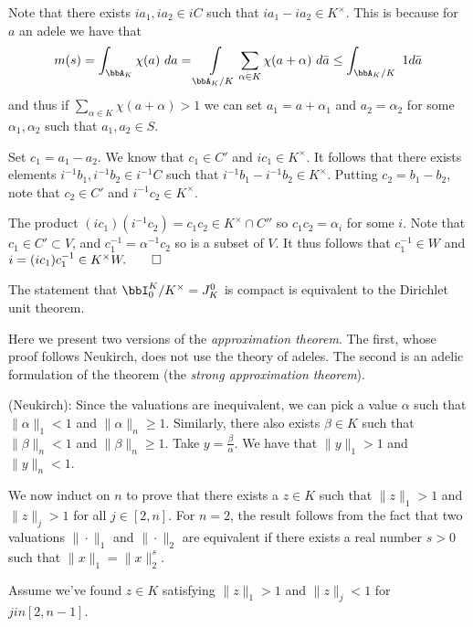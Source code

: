 \documentclass[a4paper, 12pt,oneside,openany]{book}
\begin{document}
Note that there exists $ia_1, ia_2 \in iC$ such that $ia_1-ia_2 \in K^\times$. This is because for $a$ an adele we have that $$m(s) = \int_{\bbA_K} \chi(a)\ da = \int\limits_{\bbA_K/K} \sum\limits_{\alpha \in K} \chi(a+\alpha)\ d \bar{a} \leq \int_{\bbA_K/K}\ 1 d\bar{a}$$ and thus if $\sum\limits_{\alpha \in K} \chi(a+\alpha)>1$ we can set $a_1=a+\alpha_1$ and $a_2=\alpha_2$ for some $\alpha_1, \alpha_2$ such that $a_1, a_2 \in S$. 

Set $c_1 = a_1-a_2$. We know that $c_1 \in C'$ and $ic_1 \in K^\times$. It follows that there exists elements $i^{-1}b_1, i^{-1}b_2 \in i^{-1}C$ such that $i^{-1}b_1- i^{-1}b_2 \in K^\times$. Putting $c_2=b_1-b_2$, note that $c_2 \in C'$ and $i^{-1}c_2 \in K^\times$. 

The product $(ic_1)(i^{-1}c_2)=c_1c_2 \in K^\times \cap C''$ so $c_1c_2=\alpha_i$ for some $i$. Note that $c_1 \in C' \subset V$, and $c_1^{-1}=\alpha^{-1}c_2$ so is a subset of $V$. It thus follows that $c_1^{-1} \in W$ and $i = (ic_1)c_1^{-1} \in K^\times W. \qed$

The statement that $\bbI_0^K/K^\times = J_K^0$ is compact is equivalent to the Dirichlet unit theorem.

Here we present two versions of the \emph{approximation theorem}. The first, whose proof follows Neukirch, does not use the theory of adeles. The second is an adelic formulation of the theorem (the \emph{strong approximation theorem}).


 (Neukirch): Since the valuations are inequivalent, we can pick a value $\alpha$ such that $\|\alpha \|_1 <1$ and $\|\alpha \|_n \geq 1$. Similarly, there also exists $\beta \in K$ such that $\|\beta \|_n < 1$ and $\|\beta \|_n \geq 1.$ Take $y=\frac{\beta}{\alpha}$. We have that $\|y\|_1 > 1$ and $\|y \|_n < 1$.

We now induct on $n$ to prove that there exists a $z \in K$ such that $\| z \|_1 > 1$ and $\| z \|_j > 1$ for all $j \in [2, n]$. For $n=2$, the result follows from the fact that two valuations $\| \cdot\|_1$ and $\|\cdot \|_2$ are equivalent if there exists a real number $s>0$ such that $\|x \|_1 = \|x \|^s_2$.

Assume we've found $z \in K$ satisfying $\|z \|_1 >1$ and $\|z \|_j <1$ for $j in [2, n-1]$.
\end{document}
